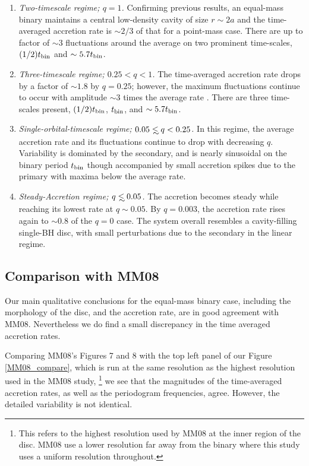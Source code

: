 \begin{enumerate}
\item {\em Two-timescale regime; $q=1$.}  Confirming previous
  results, an equal-mass binary maintains a central low-density cavity
  of size $r\sim 2a$ and the time-averaged accretion rate is $\sim2/3$ 
  of that for a point-mass case. There are up to factor of $\sim3$
  fluctuations around the average on two prominent time-scales,
  $(1/2)t_{\rm bin}$ and $\sim 5.7t_{\rm bin}$.
\item {\em Three-timescale regime; $ 0.25 < q < 1$.}  The
  time-averaged accretion rate drops by a factor of $\sim 1.8$ by
  $q=0.25$; however, the maximum fluctuations 
  continue to occur with amplitude $\sim3$ times the average rate . 
  There are three time-scales present, $(1/2)t_{\rm bin}$, $t_{\rm
    bin}$, and $\sim 5.7t_{\rm bin}$.
\item {\em Single-orbital-timescale regime; $0.05 \lsim q < 0.25$.} In
  this regime, the average accretion rate and its fluctuations continue to
  drop with decreasing $q$. Variability is dominated by the secondary, 
  and is nearly sinusoidal on the binary period $t_{\rm bin}$ though accompanied by small accretion spikes due to the primary with maxima below the average rate.
\item {\em Steady-Accretion regime; $q \lsim 0.05$.} The accretion 
  becomes steady while reaching its lowest rate at $q\sim0.05$. By $q=0.003$, the accretion rate rises 
  again to $\sim0.8$ of the $q=0$ case. The system overall resembles a 
  cavity-filling single-BH disc, with small perturbations due to 
  the secondary in the linear regime.
\end{enumerate}




\subsection{Comparison with MM08}
\label{Viscosity Dependence  and Comparison with MM08}
Our main qualitative conclusions for the equal-mass binary case,
including the morphology of the disc, and the accretion rate, are in
good agreement with MM08.  Nevertheless we do find a small 
discrepancy in the time averaged accretion rates.


Comparing MM08's Figures 7 and 8 with the top left panel of
our Figure \ref{MM08_compare}, which is run at the same 
resolution as the highest resolution used in the MM08 study,
\footnote{This refers to the highest resolution used by MM08 at the inner region of the disc. MM08 use a lower resolution far away from the binary where this study uses a uniform resolution throughout.}
%
we see that the magnitudes of the
time-averaged accretion rates, as well as the periodogram frequencies, agree. However, the detailed variability is not identical.

